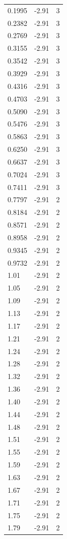 \begin{longtable}{lrr}
  0.1995 & -2.91 & 3 \\
  0.2382 & -2.91 & 3 \\
  0.2769 & -2.91 & 3 \\
  0.3155 & -2.91 & 3 \\
  0.3542 & -2.91 & 3 \\
  0.3929 & -2.91 & 3 \\
  0.4316 & -2.91 & 3 \\
  0.4703 & -2.91 & 3 \\
  0.5090 & -2.91 & 3 \\
  0.5476 & -2.91 & 3 \\
  0.5863 & -2.91 & 3 \\
  0.6250 & -2.91 & 3 \\
  0.6637 & -2.91 & 3 \\
  0.7024 & -2.91 & 3 \\
  0.7411 & -2.91 & 3 \\
  0.7797 & -2.91 & 2 \\
  0.8184 & -2.91 & 2 \\
  0.8571 & -2.91 & 2 \\
  0.8958 & -2.91 & 2 \\
  0.9345 & -2.91 & 2 \\
  0.9732 & -2.91 & 2 \\
  1.01 & -2.91 & 2 \\
  1.05 & -2.91 & 2 \\
  1.09 & -2.91 & 2 \\
  1.13 & -2.91 & 2 \\
  1.17 & -2.91 & 2 \\
  1.21 & -2.91 & 2 \\
  1.24 & -2.91 & 2 \\
  1.28 & -2.91 & 2 \\
  1.32 & -2.91 & 2 \\
  1.36 & -2.91 & 2 \\
  1.40 & -2.91 & 2 \\
  1.44 & -2.91 & 2 \\
  1.48 & -2.91 & 2 \\
  1.51 & -2.91 & 2 \\
  1.55 & -2.91 & 2 \\
  1.59 & -2.91 & 2 \\
  1.63 & -2.91 & 2 \\
  1.67 & -2.91 & 2 \\
  1.71 & -2.91 & 2 \\
  1.75 & -2.91 & 2 \\
  1.79 & -2.91 & 2 \\

\end{longtable}
